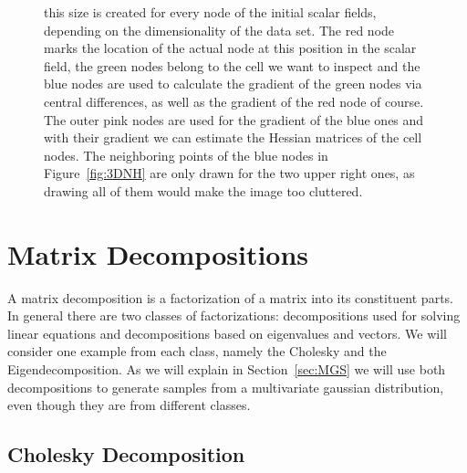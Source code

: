 \begin{figure}
{  this size is created for every node of the initial scalar fields,
  depending on the dimensionality of the data set. The red node marks
  the location of the actual node at this position in the scalar field,
  the green nodes belong to the cell we want to inspect and the blue
  nodes are used to calculate the gradient of the green nodes via
  central differences, as well as the gradient of the red node of
  course. The outer pink nodes are used for the gradient of the blue
  ones and with their gradient we can estimate the Hessian
  matrices of the cell nodes. The neighboring points of the blue nodes
  in Figure~\ref{fig:3DNH} are only drawn for the two upper right ones,
  as drawing all of them would make the image too cluttered.}
  \label{fig:NH}
\end{figure}

\section{Matrix Decompositions}

A matrix decomposition is a factorization of a matrix into its
constituent parts. In general there are two classes of factorizations:
decompositions used for solving linear equations and decompositions
based on eigenvalues and vectors. We will consider one example from each
class, namely the Cholesky and the Eigendecomposition. As we will
explain in Section~\ref{sec:MGS} we will use both decompositions to
generate samples from a multivariate gaussian distribution, even though
they are from different classes.

\subsection{Cholesky Decomposition}\label{sec:cholesky}

